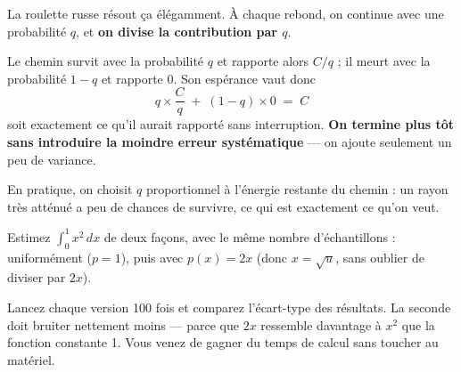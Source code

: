 La roulette russe résout ça élégamment. À chaque rebond, on continue avec une
probabilité $q$, et \textbf{on divise la contribution par $q$}.

\begin{nkretenir}
Le chemin survit avec la probabilité $q$ et rapporte alors $C/q$ ; il meurt
avec la probabilité $1-q$ et rapporte 0. Son espérance vaut donc
\[ q \times \frac{C}{q} \;+\; (1-q) \times 0 \;=\; C \]
soit exactement ce qu'il aurait rapporté sans interruption. \textbf{On termine
plus tôt sans introduire la moindre erreur systématique} — on ajoute seulement
un peu de variance.
\end{nkretenir}

En pratique, on choisit $q$ proportionnel à l'énergie restante du chemin : un
rayon très atténué a peu de chances de survivre, ce qui est exactement ce
qu'on veut.

\begin{nkexo}
Estimez $\int_0^1 x^2\,dx$ de deux façons, avec le même nombre d'échantillons :
uniformément ($p = 1$), puis avec $p(x) = 2x$ (donc $x = \sqrt{u}$, sans
oublier de diviser par $2x$).

Lancez chaque version 100 fois et comparez l'écart-type des résultats. La
seconde doit bruiter nettement moins — parce que $2x$ ressemble davantage à
$x^2$ que la fonction constante 1. Vous venez de gagner du temps de calcul sans
toucher au matériel.
\end{nkexo}
